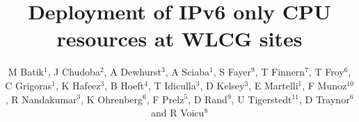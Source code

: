 \documentclass[a4paper]{jpconf}
\begin{document}
\title{Deployment of IPv6 only CPU resources at WLCG sites}


\author{M Batik$^1$, J Chudoba$^2$, A Dewhurst$^3$, A Sciaba$^1$, S Fayer$^9$, T Finnern$^7$,  T Froy$^6$, C Grigoras$^1$, K Hafeez$^3$, B Hoeft$^4$, T Idiculla$^3$, D Kelsey$^3$, E Martelli$^1$, F Munoz$^{10}$, R Nandakumar$^3$,  K Ohrenberg$^6$, F Prelz$^5$,  D Rand$^9$, U Tigerstedt$^{11}$, D Traynor$^6$ and R Voicu$^8$}


\address{$^1$ CERN, CH-1211 Gen\`{e}ve 23, Switzerland}
\address{$^2$ Institute of Physics, Academy of Sciences of the Czech Republic Na Slovance 2 182 21 Prague 8, Czech Republic}
\address{$^3$ STFC - Rutherford Appleton Lab. UK}
\address{$^4$ Karlsruher Institut f\"{u}r Technologie, Hermann-von-Helmholtz-Platz 1, D-76344 Eggenstein-Leopoldshafen, Germany}
\address{$^5$ INFN, Sezione di Milano, via G. Celoria 16, I-20133 Milano, Italy}
\address{$^6$ Queen Mary University of London, Mile End Road, London E1 4NS, United Kingdom}
\address{$^7$ Deutsches Elektronen-Synchrotron, Notkestra{\ss}e 85, D-22607 Hamburg, Germany}
\address{$^8$ California Institute of Technology, Pasadena, Ca 91125, U.S.A.}
\address{$^9$ Imperial College London, South Kensington Campus, London SW7 2AZ, United Kingdom}
\address{$^{10}$ Port d’Informaci\'{o} Cient\'{i}fica (PIC), Universitat Aut\`{o}noma de Barcelona, Bellaterra (Barcelona), Spain}
\address{$^{11}$ CSC Tieteen Tietotekniikan Keskus Oy, P.O. Box 405, FI-02101 Espoo, Finland}

\end{document}
